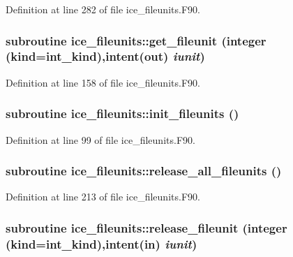 Definition at line 282 of file ice\_\-fileunits.F90.\hypertarget{namespaceice__fileunits_ad6283e44cc881fd1d0d6250cbb83a2e2}{
\subsubsection[{get\_\-fileunit}]{\setlength{\rightskip}{0pt plus 5cm}subroutine ice\_\-fileunits::get\_\-fileunit (integer (kind=int\_\-kind),intent(out) {\em iunit})}}
\label{namespaceice__fileunits_ad6283e44cc881fd1d0d6250cbb83a2e2}


Definition at line 158 of file ice\_\-fileunits.F90.\hypertarget{namespaceice__fileunits_adf82bd4005c28d7632bc120150ca5ebc}{
\subsubsection[{init\_\-fileunits}]{\setlength{\rightskip}{0pt plus 5cm}subroutine ice\_\-fileunits::init\_\-fileunits ()}}
\label{namespaceice__fileunits_adf82bd4005c28d7632bc120150ca5ebc}


Definition at line 99 of file ice\_\-fileunits.F90.\hypertarget{namespaceice__fileunits_a6e1bf3b046e5d9d67076539af78445ef}{
\subsubsection[{release\_\-all\_\-fileunits}]{\setlength{\rightskip}{0pt plus 5cm}subroutine ice\_\-fileunits::release\_\-all\_\-fileunits ()}}
\label{namespaceice__fileunits_a6e1bf3b046e5d9d67076539af78445ef}


Definition at line 213 of file ice\_\-fileunits.F90.\hypertarget{namespaceice__fileunits_a6edc4f5f2fe087f5651f7d4b7f595eeb}{
\subsubsection[{release\_\-fileunit}]{\setlength{\rightskip}{0pt plus 5cm}subroutine ice\_\-fileunits::release\_\-fileunit (integer (kind=int\_\-kind),intent(in) {\em iunit})}}
\label{namespaceice__fileunits_a6edc4f5f2fe087f5651f7d4b7f595eeb}



